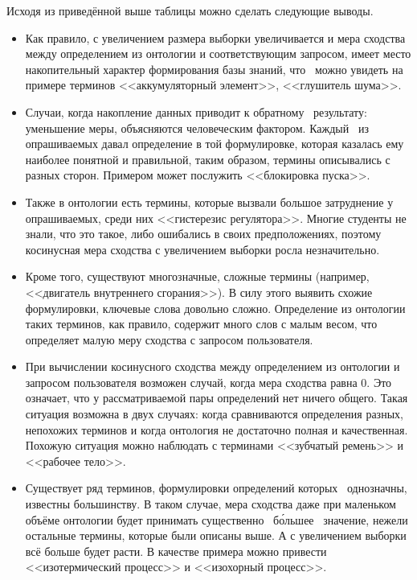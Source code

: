 Исходя из приведённой выше таблицы можно сделать следующие выводы.
\begin{itemize}
	\item Как правило, с увеличением размера выборки увеличивается и мера сходства между определением из онтологии и соответствующим запросом, имеет место накопительный характер формирования базы знаний, что \, можно увидеть на примере терминов <<аккумуляторный элемент>>, <<глушитель шума>>. 
	
	\item Случаи, когда накопление данных приводит к обратному \, результату: \, уменьшение меры, объясняются человеческим фактором. Каждый \, из \, опрашиваемых давал определение в той формулировке, которая казалась ему наиболее понятной и правильной, таким образом, термины описывались с разных сторон. Примером может послужить <<блокировка пуска>>.
	
	\item Также в онтологии есть термины, которые вызвали большое затруднение у опрашиваемых, среди них <<гистерезис регулятора>>. Многие студенты не знали, что это такое, либо ошибались в своих предположениях, поэтому косинусная мера сходства с увеличением выборки росла незначительно.
	
	\item Кроме того, существуют многозначные, сложные термины (например, \, <<двигатель внутреннего сгорания>>). В силу этого выявить схожие формулировки, ключевые слова довольно сложно. Определение из онтологии таких терминов, как правило, содержит много слов с малым весом, что определяет малую меру сходства с запросом пользователя.
	
	\item При вычислении косинусного сходства между определением из онтологии и запросом пользователя возможен случай, когда мера сходства равна 0. Это означает, что у рассматриваемой пары определений нет ничего общего. Такая ситуация возможна в двух случаях: когда сравниваются определения разных, непохожих терминов и когда онтология не достаточно полная и качественная. Похожую ситуация можно наблюдать с терминами <<зубчатый ремень>> и <<рабочее тело>>. 
	
	\item Существует ряд терминов, формулировки определений которых \, однозначны, известны большинству. В таком случае, мера сходства даже при маленьком объёме онтологии будет принимать существенно \, бо́льшее \, значение, нежели остальные термины, которые были описаны выше. А с увеличением выборки всё больше будет расти. В качестве примера можно привести <<изотермический процесс>> и <<изохорный процесс>>. \\
\end{itemize}

